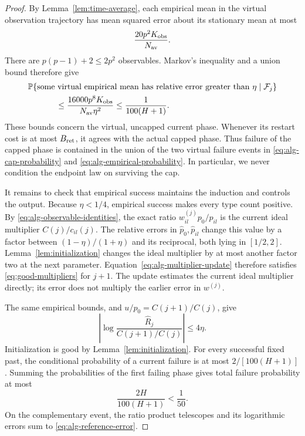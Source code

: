 \begin{proof}
By Lemma~\ref{lem:time-average}, each empirical mean in the virtual
observation trajectory has mean squared error about its stationary
mean at most
\[
 \frac{20p^2K_{\rm obs}}{N_{\rm av}}.
\]
There are \(p(p-1)+2\leq 2p^2\) observables.  Markov's
inequality and a union bound therefore give
\begin{equation}
\begin{split}
 &\mathbb P\{\text{some virtual empirical mean has
 relative error greater than }\eta
               \mid\mathcal F_j\}\\
 &\hspace{12mm}\leq
 \frac{16000p^8K_{\rm obs}}{N_{\rm av}\eta^2}
 \leq\frac{1}{100(H+1)}.
\end{split}
\label{eq:alg-empirical-probability}
\end{equation}
These bounds concern the virtual, uncapped current phase.  Whenever
its restart cost is at most \(B_{\rm ret}\), it agrees with the
actual capped phase.  Thus failure of the capped phase is contained
in the union of the two virtual failure events in
\eqref{eq:alg-cap-probability} and
\eqref{eq:alg-empirical-probability}.  In particular, we never
condition the endpoint law on surviving the cap.

It remains to check that empirical success maintains the induction
and controls the output.  Because \(\eta<1/4\), empirical success
makes every type count positive. By
\eqref{eq:alg-observable-identities}, the exact ratio
\(w_{il}^{(j)}p_0/p_{il}\) is the current ideal multiplier
\(C(j)/c_{il}(j)\). The relative errors in
\(\widehat p_0,\widehat p_{il}\) change this value by a factor between
\((1-\eta)/(1+\eta)\) and its reciprocal, both lying in
\([1/2,2]\).  Lemma~\ref{lem:initialization} changes the ideal
multiplier by at most another factor two at the next parameter.
Equation~\eqref{eq:alg-multiplier-update} therefore satisfies
\eqref{eq:good-multipliers} for \(j+1\).  The update estimates the
current ideal multiplier directly; its error does not multiply the
earlier error in \(w^{(j)}\).

The same empirical bounds, and
\(u/p_0=C(j+1)/C(j)\), give
\[
 \left|\log\frac{\widehat R_j}{C(j+1)/C(j)}\right|
 \leq 4\eta.
\]
Initialization is good by Lemma~\ref{lem:initialization}.
For every successful fixed past, the conditional probability of a
current failure is at most \(2/[100(H+1)]\).  Summing the
probabilities of the first failing phase gives total failure
probability at most
\[
 \frac{2H}{100(H+1)}<\frac1{50}.
\]
On the complementary event, the ratio product telescopes and its
logarithmic errors sum to \eqref{eq:alg-reference-error}.
\end{proof}

